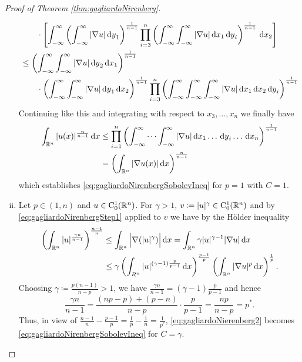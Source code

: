 \begin{proof}[Proof of Theorem \ref{thm:gagliardoNirenberg}]
\begin{enumerate}[i)]
\begin{align*}
        &\quad\quad \cdot \left[ \int_{-\infty}^\infty \left( \int_{-\infty}^\infty |\nabla u| \d y_1 \right)^{\frac{1}{n - 1}} \prod_{i = 3}^n \left( \int_{-\infty}^\infty \int_{-\infty}^\infty  |\nabla u| \d x_1 \d y_i \right)^{\frac{1}{n - 1}} \d x_2 \right] \\
        &\leq \left( \int_{-\infty}^\infty \int_{-\infty}^\infty |\nabla u| \d y_2 \d x_1 \right)^{\frac{1}{n - 1}} \\
        &\quad\quad \cdot \left( \int_{-\infty}^\infty \int_{-\infty}^\infty | \nabla u| \d y_1 \d x_2 \right)^{\frac{1}{n - 1}} \prod_{i = 3}^n \left( \int_{-\infty}^\infty \int_{-\infty}^\infty \int_{-\infty}^\infty |\nabla u| \d x_1 \d x_2 \d y_i  \right)^{\frac{1}{n - 1}}
      \end{align*}
      Continuing like this and integrating with respect to $x_3,\dots,x_n$ we finally have
      \begin{align}
        \label{eq:gagliardoNirenbergStep1}
        \int_{\mathbb{R}^n} |u(x)|^{\frac{n}{n - 1}} \, {\operatorname{d}\!{x}}
        &\leq \prod_{i = 1}^n \left( \int_{-\infty}^\infty \cdots \int_{-\infty}^\infty |\nabla u| \, {\operatorname{d}\!{x}}_1 \dots \, {\operatorname{d}\!{y}}_i  \dots \, {\operatorname{d}\!{x}}_n \right)^{\frac{1}{n - 1}} \\
        &= \left( \int_{\mathbb{R}^n} |\nabla u(x)| \, {\operatorname{d}\!{x}} \right)^{\frac{n}{n - 1}}\nonumber
      \end{align}
      which establishes \eqref{eq:gagliardoNirenbergSobolevIneq} for $p = 1$ with $C = 1$.

    \item Let $p \in (1,n)$ and $u \in \mathrm{C}_0^1(\mathbb{R}^n)$.
      For $\gamma > 1$, $v \coloneqq |u|^\gamma \in \mathrm{C}_0^1(\mathbb{R}^n)$ and by \eqref{eq:gagliardoNirenbergStep1} applied to $v$ we have by the Hölder inequality
      \begin{align}
        \label{eq:gagliardoNierenberg2}
        \left(\int_{\mathbb{R}^n} |u|^{\frac{\gamma n}{n - 1}} \right)^{\frac{n - 1}{n}}
        &\leq \int_{\mathbb{R}^n} \Big| \nabla (|u|^\gamma) \Big| \, {\operatorname{d}\!{x}} 
        = \int_{\mathbb{R}^n} \gamma | u|^{\gamma - 1} | \nabla u| \, {\operatorname{d}\!{x}} \\ 
        &\leq \gamma \left(\int_{R^n} |u|^{(\gamma - 1) \frac{p}{p - 1}} \, {\operatorname{d}\!{x}} \right)^{\frac{p - 1}{p}} \left( \int_{\mathbb{R}^n} | \nabla u|^p \, {\operatorname{d}\!{x}} \right)^{\frac{1}{p}}. \nonumber
      \end{align}
      Choosing $\gamma \coloneqq \frac{p (n - 1)}{n - p} > 1$, we have $\frac{\gamma n}{n - 1} = (\gamma - 1)\frac{p}{p - 1}$ and hence
      $$
      \frac{\gamma n}{n - 1} = \frac{(np - p) + (p - n)}{n - p} \cdot \frac{p }{p - 1} = \frac{n p }{n - p} = p^*.
      $$
      Thus, in view of $\frac{n - 1}{n} - \frac{p - 1}{p} = \frac{1}{p} - \frac{1}{n} = \frac{1}{p^*}$, \eqref{eq:gagliardoNierenberg2} becomes \eqref{eq:gagliardoNirenbergSobolevIneq} for $C = \gamma$.


\end{enumerate}
\end{proof}
